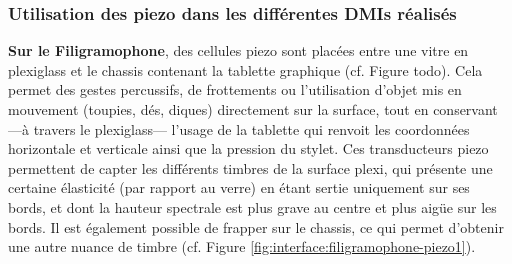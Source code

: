 \subsubsection{Utilisation des piezo dans les différentes DMIs réalisés}
\indent \textbf{Sur le Filigramophone}, des cellules piezo sont placées entre une vitre en plexiglass et le chassis contenant la tablette graphique (cf. Figure todo). Cela permet des gestes percussifs, de frottements ou l'utilisation d'objet mis en mouvement (toupies, dés, diques) directement sur la surface, tout en conservant —à travers le plexiglass— l'usage de la tablette qui renvoit les coordonnées horizontale et verticale ainsi que la pression du stylet. Ces transducteurs piezo permettent de capter les différents timbres de la surface plexi, qui présente une certaine élasticité (par rapport au verre) en étant sertie uniquement sur ses bords, et dont la hauteur spectrale est plus grave au centre et plus aigüe sur les bords. Il est également possible de frapper sur le chassis, ce qui permet d'obtenir une autre nuance de timbre (cf. Figure \ref{fig:interface:filigramophone-piezo1}).\\
